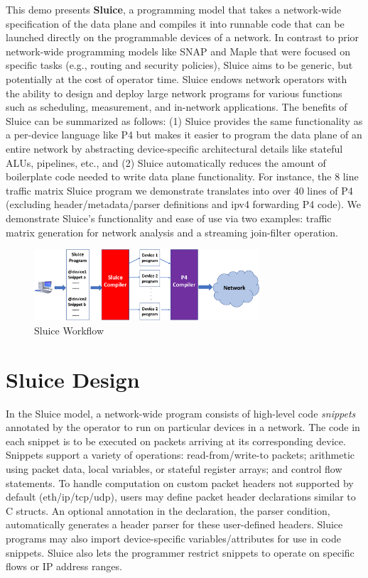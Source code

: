 This demo presents \textbf{Sluice}, a programming model that takes a
network-wide specification of the data plane and compiles it into runnable code
that can be launched directly on the programmable devices of a network. In
contrast to prior network-wide programming models like SNAP and Maple that were
focused on specific tasks (e.g., routing and security policies), Sluice aims to
be generic, but potentially at the cost of operator time.
Sluice endows network operators with the ability to design and deploy large
network programs for various functions such as scheduling, measurement, and in-network applications.  The benefits of Sluice can be summarized as follows: (1) Sluice provides the same functionality as a per-device language like P4 but makes it easier to program the data plane of an entire network by abstracting device-specific architectural details like stateful ALUs, pipelines, etc., and (2) Sluice automatically reduces the amount of boilerplate code needed to write data plane functionality. For instance, the 8 line traffic matrix Sluice program we demonstrate translates into over 40 lines of P4 (excluding header/metadata/parser definitions and ipv4 forwarding P4 code). We demonstrate Sluice's functionality and ease of use via two examples: traffic matrix generation for network analysis and a streaming join-filter operation.
\begin{figure}[tp]
\centering
\includegraphics[width=84mm,scale=0.7]{figures/sluice_workflow.pdf}
\caption{Sluice Workflow}
\vspace{-10mm}
\end{figure}
\vspace{-4mm}

\section{Sluice Design}
In the Sluice model, a network-wide program consists of high-level code
\textit{snippets} annotated by the operator to run on particular devices in a
network. The code in each snippet is to be executed on packets arriving at its
corresponding device. Snippets support a variety of operations:
read-from/write-to packets; arithmetic using packet data, local variables, or
stateful register arrays; and control flow statements. To handle computation on
custom packet headers not supported by default (eth/ip/tcp/udp), users may
define packet header declarations similar to C structs. An optional annotation
in the declaration, the parser condition, automatically generates a header
parser for these user-defined headers. Sluice programs may also import
device-specific variables/attributes for use in code snippets. Sluice also lets
the programmer restrict snippets to operate on specific flows or IP address
ranges.

